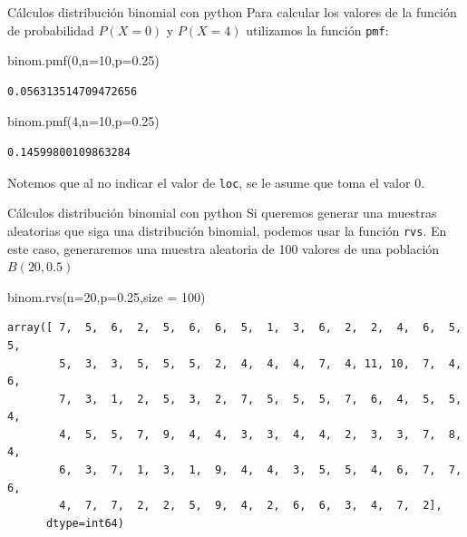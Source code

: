 \documentclass[
  ignorenonframetext,
  aspectratio=169]{beamer}
\newenvironment{Shaded}{\begin{snugshade}}{\end{snugshade}}
\newcommand{\DecValTok}[1]{\textcolor[rgb]{0.68,0.00,0.00}{#1}}
\newcommand{\FloatTok}[1]{\textcolor[rgb]{0.68,0.00,0.00}{#1}}
\newcommand{\NormalTok}[1]{\textcolor[rgb]{0.00,0.23,0.31}{#1}}
\newcommand{\OperatorTok}[1]{\textcolor[rgb]{0.37,0.37,0.37}{#1}}
\begin{document}
\begin{frame}[fragile]{Cálculos distribución binomial con python}
\protect\hypertarget{cuxe1lculos-distribuciuxf3n-binomial-con-python-2}{}
Para calcular los valores de la función de probabilidad \(P(X=0)\) y
\(P(X=4)\) utilizamos la función \texttt{pmf}:

\begin{Shaded}
\begin{Highlighting}[]
\NormalTok{binom.pmf(}\DecValTok{0}\NormalTok{,n}\OperatorTok{=}\DecValTok{10}\NormalTok{,p}\OperatorTok{=}\FloatTok{0.25}\NormalTok{)}
\end{Highlighting}
\end{Shaded}

\begin{verbatim}
0.056313514709472656
\end{verbatim}

\begin{Shaded}
\begin{Highlighting}[]
\NormalTok{binom.pmf(}\DecValTok{4}\NormalTok{,n}\OperatorTok{=}\DecValTok{10}\NormalTok{,p}\OperatorTok{=}\FloatTok{0.25}\NormalTok{)}
\end{Highlighting}
\end{Shaded}

\begin{verbatim}
0.14599800109863284
\end{verbatim}

Notemos que al no indicar el valor de \texttt{loc}, se le asume que toma
el valor 0.
\end{frame}

\begin{frame}[fragile]{Cálculos distribución binomial con python}
\protect\hypertarget{cuxe1lculos-distribuciuxf3n-binomial-con-python-3}{}
Si queremos generar una muestras aleatorias que siga una distribución
binomial, podemos usar la función \texttt{rvs}. En este caso,
generaremos una muestra aleatoria de 100 valores de una población
\(B(20,0.5)\)

\begin{Shaded}
\begin{Highlighting}[]
\NormalTok{binom.rvs(n}\OperatorTok{=}\DecValTok{20}\NormalTok{,p}\OperatorTok{=}\FloatTok{0.25}\NormalTok{,size }\OperatorTok{=} \DecValTok{100}\NormalTok{)}
\end{Highlighting}
\end{Shaded}

\begin{verbatim}
array([ 7,  5,  6,  2,  5,  6,  6,  5,  1,  3,  6,  2,  2,  4,  6,  5,  5,
        5,  3,  3,  5,  5,  5,  2,  4,  4,  4,  7,  4, 11, 10,  7,  4,  6,
        7,  3,  1,  2,  5,  3,  2,  7,  5,  5,  5,  7,  6,  4,  5,  5,  4,
        4,  5,  5,  7,  9,  4,  4,  3,  3,  4,  4,  2,  3,  3,  7,  8,  4,
        6,  3,  7,  1,  3,  1,  9,  4,  4,  3,  5,  5,  4,  6,  7,  7,  6,
        4,  7,  7,  2,  2,  5,  9,  4,  2,  6,  6,  3,  4,  7,  2],
      dtype=int64)
\end{verbatim}
\end{frame}
\end{document}
